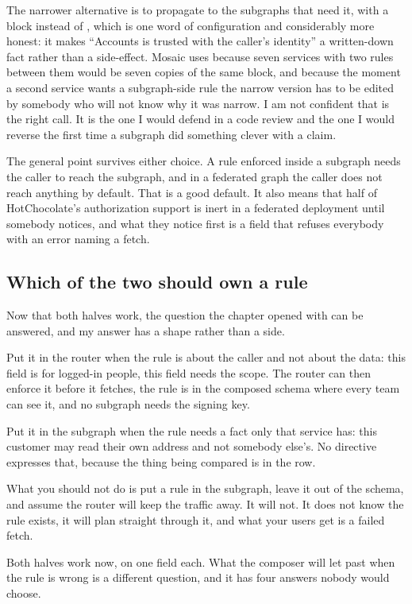 The narrower alternative is to propagate to the subgraphs that need it, with a
 block instead of , which is one word of
configuration and considerably more honest: it makes \enquote{Accounts is
trusted with the caller's identity} a written-down fact rather than a
side-effect. Mosaic uses  because seven services with two rules
between them would be seven copies of the same block, and because the moment a
second service wants a subgraph-side rule the narrow version has to be edited
by somebody who will not know why it was narrow. I am not confident that is the
right call. It is the one I would defend in a code review and the one I would
reverse the first time a subgraph did something clever with a claim.

The general point survives either choice. A rule enforced inside a subgraph
needs the caller to reach the subgraph, and in a federated graph the caller
does not reach anything by default. That is a good default. It also means that
half of HotChocolate's authorization support is inert in a federated
deployment until somebody notices, and what they notice first is a field that
refuses everybody with an error naming a fetch.

\subsection*{Which of the two should own a rule}

%
Now that both halves work, the question the chapter opened with can be
answered, and my answer has a shape rather than a side.

Put it in the router when the rule is about the caller and not about the data:
this field is for logged-in people, this field needs the  scope.
The router can then enforce it before it fetches, the rule is in the composed
schema where every team can see it, and no subgraph needs the signing key.

Put it in the subgraph when the rule needs a fact only that service has: this
customer may read their own address and not somebody else's. No directive
expresses that, because the thing being compared is in the row.

What you should not do is put a rule in the subgraph, leave it out of the
schema, and assume the router will keep the traffic away. It will not. It does
not know the rule exists, it will plan straight through it, and what your users
get is a failed fetch.

\medskip

Both halves work now, on one field each. What the composer will let past when
the rule is wrong is a different question, and it has four answers nobody
would choose.

%
